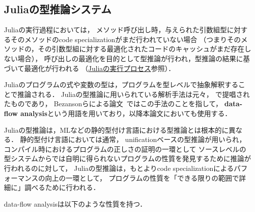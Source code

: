 

\subsection{Juliaの型推論システム} \label{subsection:julia-type-inference}

Juliaの実行過程においては，
メソッド呼び出し時，与えられた引数組型に対するそのメソッドのcode specializationがまだ行われていない場合
（つまりそのメソッドの，その引数型組に対する最適化されたコードのキャッシュがまだ存在しない場合），
呼び出しの最適化を目的として型推論が行われ，型推論の結果に基づいて最適化が行われる
（\hyperref[subsubsection:eval-process]{Juliaの実行プロセス}参照）．

Juliaのプログラムの式や変数の型は，プログラムを型レベルで抽象解釈することで推論される．
Juliaの型推論に用いられている解析手法は元々，
\cite{abstract-interpretation, scheme-for-automatic-inference}で提唱されたものであり，
Bezansonらによる論文~\cite{jeff-phd, jeff-master, julia-2012}ではこの手法のことを指して，
\textbf{data-flow analysis}という用語を用いており，以降本論文においても使用する．

Juliaの型推論は，MLなどの静的型付け言語における型推論とは根本的に異なる．
静的型付け言語においては通常，
unificationベースの型推論\cite{milner}が用いられ，
コンパイル時におけるプログラムの正しさの証明の一環として
ソースレベルの型システムからでは自明に得られないプログラムの性質を発見するために推論が行われるのに対して，
Juliaの型推論は，もとよりcode specializationによるパフォーマンスの向上の一環として，
プログラムの性質を「できる限りの範囲で詳細に\cite{jeff-phd}」調べるために行われる．

data-flow analysisは以下のような性質を持つ．

